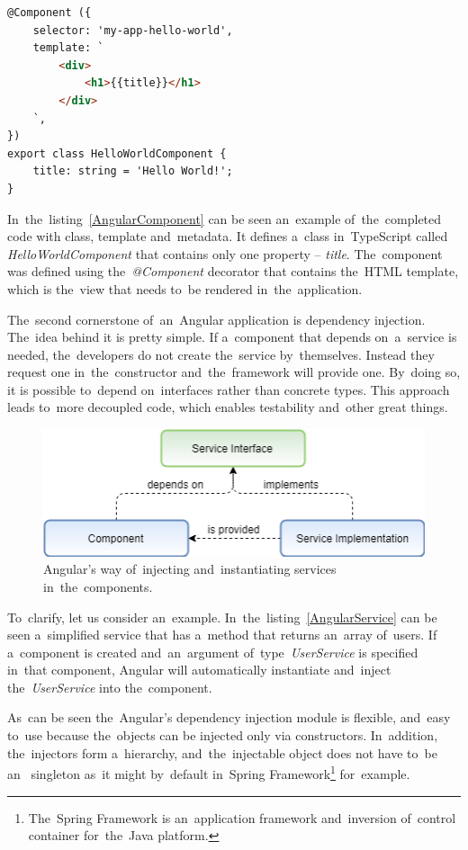 \pagebreak
\begin{lstlisting}[caption=An Angular class with the~\textit{@Component}
decorator and~a~template., label=AngularComponent, language=HTML]
@Component ({
	selector: 'my-app-hello-world',
	template: `
		<div>
			<h1>{{title}}</h1>
		</div>
	`,
})
export class HelloWorldComponent {
	title: string = 'Hello World!';
}
\end{lstlisting}

In~the~listing~\ref{AngularComponent} can be seen an~example of~the~completed
code with class, template and~metadata. It defines a~class in~TypeScript called
\textit{HelloWorldComponent} that contains only one property -- \textit{title}.
The~component was defined using the~\textit{@Component} decorator that contains
the~HTML template, which is the~view that needs to~be rendered
in~the~application.

The~second cornerstone of~an~Angular application is dependency injection.
The~idea behind it is pretty simple. If a~component that depends on~a~service is
needed, the~developers do not create the~service by~themselves. Instead they
request one in~the~constructor and~the~framework will provide one. By~doing so,
it is possible to~depend on~interfaces rather than concrete types. This approach leads to~more
decoupled code, which enables testability and~other great things.

\begin{figure}[!hbt]
	\centering
	\includegraphics[scale=0.65]{./obrazky-figures/DI.png}
	\caption{Angular's way of~injecting and~instantiating services
	in~the~components.}
	\label{DependencyInjection}
\end{figure}

To~clarify, let us consider an~example. In~the~listing~\ref{AngularService} can
be seen a~simplified service that has a~method that returns an~array
of~users.
If a~component is created and~an~argument of~type~\textit{UserService} is
specified in~that component, Angular will automatically instantiate and~inject
the~\textit{UserService} into the~component.

As~can be seen the~Angular's dependency injection
module is flexible, and~easy to~use because the~objects can be injected only via
constructors. In~addition, the~injectors form a~hierarchy, and~the~injectable
object does not have to~be an~ singleton as~it might
by~default in~Spring Framework\footnote{The~Spring Framework is an~application
framework and~inversion of~control container for~the~Java platform.}
for~example.

